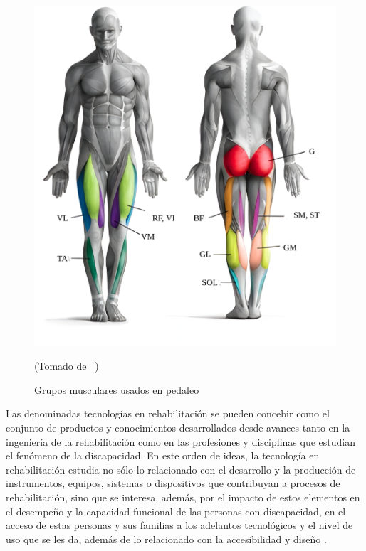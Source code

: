 \begin{figure}[ht]
    \centering
    \includegraphics[scale=0.2]{images/musculegroups.png}
    \caption{Grupos musculares usados en pedaleo}
    (Tomado de ~\cite{Quémúsc72})
    \label{fig: musculegroups}
\end{figure}

Las denominadas tecnologías en rehabilitación se pueden concebir como el conjunto de productos y conocimientos desarrollados desde avances tanto en la ingeniería de la rehabilitación como en las profesiones y disciplinas que estudian el fenómeno de la discapacidad. En este orden de ideas, la tecnología en rehabilitación estudia no sólo lo relacionado con el desarrollo y la producción de instrumentos, equipos, sistemas o dispositivos que contribuyan a procesos de rehabilitación, sino que se interesa, además, por el impacto de estos elementos en el desempeño y la capacidad funcional de las personas con discapacidad, en el acceso de estas personas y sus familias a los adelantos tecnológicos y el nivel de uso que se les da, además de lo relacionado con la accesibilidad y diseño \cite{matheus1990tecnologia}.

